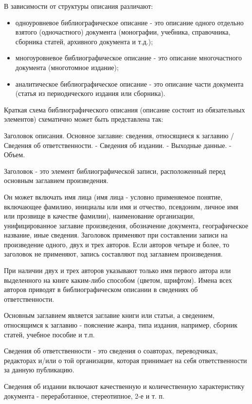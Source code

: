 В зависимости от структуры описания различают:
\begin{itemize}
	\item одноуровневое библиографическое описание - это описание одного отдельно взятого (одночастного) документа (монографии, учебника, справочника, сборника статей, архивного документа и т.д.);
	\item многоуровневое библиографическое описание - это описание многочастного документа (многотомное издание);
	\item аналитическое библиографическое описание - это описание части документа (статья из периодического издания или сборника).
\end{itemize}

Краткая схема библиографического описания (описание состоит из обязательных элементов) схематично может быть представлена так:

Заголовок описания. Основное заглавие: сведения, относящиеся к заглавию / Сведения об ответственности. - Сведения об издании. - Выходные данные. - Объем.

Заголовок - это элемент библиографической записи, расположенный перед основным заглавием произведения.

Он может включать имя лица (имя лица - условно применяемое понятие, включающее фамилию, инициалы или имя и отчество, псевдоним, личное имя или прозвище в качестве фамилии), наименование организации, унифицированное заглавие произведения, обозначение документа, географическое название, иные сведения. Заголовок применяют при составлении записи на произведение одного, двух и трех авторов. Если авторов четыре и более, то заголовок не применяют, запись составляют под заглавием произведения.

При наличии двух и трех авторов указывают только имя первого автора или выделенного на книге каким-либо способом (цветом, шрифтом). Имена всех авторов приводят в библиографическом описании в сведениях об ответственности.

Основным заглавием является заглавие книги или статьи, а сведением, относящимся к заглавию - пояснение жанра, типа издания, например, сборник статей, учебное пособие и т.п.

Сведения об ответственности - это сведения о соавторах, переводчиках, редакторах и/или о той организации, которая принимает на себя ответственности за данную публикацию.

Сведения об издании включают качественную и количественную характеристику документа - переработанное, стереотипное, 2-е и т. п.


